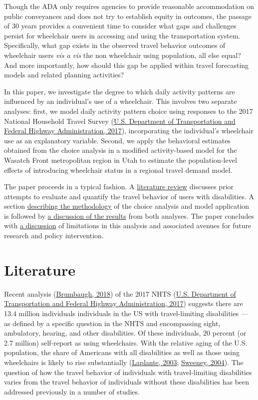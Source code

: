 \documentclass[3p, authoryear, review]{elsarticle} %
\begin{document}
Though the ADA only requires agencies to provide reasonable accommodation on
public conveyances and does not try to establish equity in outcomes, the passage
of 30 years provides a convenient time to consider what gaps and challenges
persist for wheelchair users in accessing and using the transportation system.
Specifically, what gap exists in the observed travel behavior outcomes of
wheelchair users \emph{vis a vis} the non wheelchair using population, all else equal?
And more importantly, how should this gap be applied within travel forecasting
models and related planning activities?

In this paper, we investigate the degree to which daily activity patterns are
influenced by an individual's use of a wheelchair. This involves two separate
analyses: first, we model daily activity pattern choice using responses to the
2017 National Household Travel Survey (\protect\hyperlink{ref-fhwa2017}{U.S. Department of Transportation and Federal Highway Administration, 2017}), incorporating the individual's
wheelchair use as an explanatory variable. Second, we apply the behavioral
estimates obtained from the choice analysis in a modified activity-based model
for the Wasatch Front metropolitan region in Utah to estimate the
population-level effects of introducing wheelchair status in a regional travel
demand model.

The paper proceeds in a typical fashion. A \protect\hyperlink{literature}{literature review}
discusses prior attempts to evaluate and quantify the travel behavior of
users with disabilities. A section \protect\hyperlink{methodology}{describing the methodology}
of the choice analysis and model application is followed by \protect\hyperlink{results}{a discussion of the results}
from both analyses. The paper concludes with \protect\hyperlink{discussion}{a discussion}
of limitations in this analysis and associated avenues for future research and
policy intervention.

\hypertarget{sec-literature}{%
\section{Literature}\label{sec-literature}}

Recent analysis (\protect\hyperlink{ref-Brumbaugh2018}{Brumbaugh, 2018}) of the 2017 NHTS (\protect\hyperlink{ref-fhwa2017}{U.S. Department of Transportation and Federal Highway Administration, 2017}) suggests there are 13.4
million individuals individuals in the US with travel-limiting disabilities --- as defined by a
specific question in the NHTS and encompassing sight, ambulatory, hearing, and
other disabilities. Of these individuals, 20 percent (or 2.7
million) self-report as using wheelchairs. With the relative aging of the U.S.
population, the share of Americans with all disabilities as well as those using
wheelchairs is likely to rise substantially (\protect\hyperlink{ref-Laplante2003}{Laplante, 2003}; \protect\hyperlink{ref-Sweeney2004}{Sweeney, 2004}).
The question of how the travel behavior of individuals with travel-limiting
disabilities varies from the travel behavior of individuals without these
disabilities has been addressed previously in a number of studies.
\end{document}
